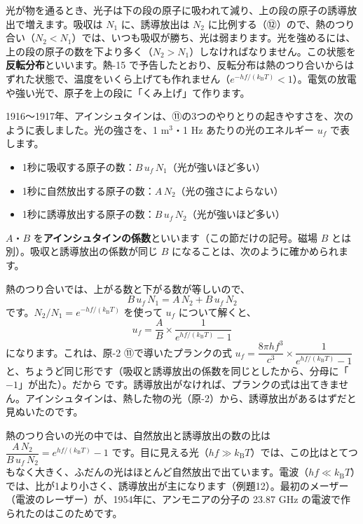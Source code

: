光が物を通るとき、光子は下の段の原子に吸われて減り、上の段の原子の誘導放出で増えます。吸収は $N_1$ に、誘導放出は $N_2$ に比例する（⑫）ので、熱のつり合い（$N_2<N_1$）では、いつも吸収が勝ち、光は弱まります。光を強めるには、上の段の原子の数を下より多く（$N_2>N_1$）しなければなりません。この状態を\textbf{反転分布}といいます。熱-15 で予告したとおり、反転分布は熱のつり合いからはずれた状態で、温度をいくら上げても作れません（$e^{-hf/(k_{\mathrm B}T)}<1$）。電気の放電や強い光で、原子を上の段に「くみ上げ」て作ります。

\label{ph:原-4:sec12}
1916〜1917年、アインシュタインは、⑪の3つのやりとりの起きやすさを、次のように表しました。光の強さを、1 m$^3$・1 Hz あたりの光のエネルギー $u_f$ で表します。
\begin{itemize}[leftmargin=1.2\zw, itemsep=2pt, topsep=2pt, label={\color{bkTheme}●}]
\item 1秒に吸収する原子の数：$B\,u_f\,N_1$（光が強いほど多い）
\item 1秒に自然放出する原子の数：$A\,N_2$（光の強さによらない）
\item 1秒に誘導放出する原子の数：$B\,u_f\,N_2$（光が強いほど多い）
\end{itemize}
$A$・$B$ を\textbf{アインシュタインの係数}といいます（この節だけの記号。磁場 $B$ とは別）。吸収と誘導放出の係数が同じ $B$ になることは、次のように確かめられます。

熱のつり合いでは、上がる数と下がる数が等しいので、
\[ B\,u_f\,N_1=A\,N_2+B\,u_f\,N_2 \]
です。$N_2/N_1=e^{-hf/(k_{\mathrm B}T)}$ を使って $u_f$ について解くと、
\[ u_f=\frac{A}{B}\times\frac{1}{e^{hf/(k_{\mathrm B}T)}-1} \]
になります。これは、原-2 ⑪で導いたプランクの式 $u_f=\dfrac{8\pi hf^3}{c^3}\times\dfrac{1}{e^{hf/(k_{\mathrm B}T)}-1}$ と、ちょうど同じ形です（吸収と誘導放出の係数を同じとしたから、分母に「$-1$」が出た）。だから
\label{ph:原-4:ab}です。誘導放出がなければ、プランクの式は出てきません。アインシュタインは、熱した物の光（原-2）から、誘導放出があるはずだと見ぬいたのです。

\begin{phyomi}[自然放出と誘導放出の比]
熱のつり合いの光の中では、自然放出と誘導放出の数の比は $\dfrac{A\,N_2}{B\,u_f\,N_2}=e^{hf/(k_{\mathrm B}T)}-1$ です。目に見える光（$hf\gg k_{\mathrm B}T$）では、この比はとてつもなく大きく、ふだんの光はほとんど自然放出で出ています。電波（$hf\ll k_{\mathrm B}T$）では、比が1より小さく、誘導放出が主になります（例題12）。最初のメーザー（電波のレーザー）が、1954年に、アンモニアの分子の 23.87 GHz の電波で作られたのはこのためです。
\end{phyomi}

